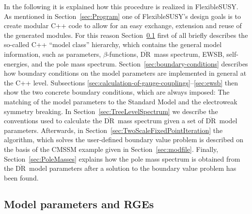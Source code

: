 \documentclass[final,3p,11pt,pdflatex]{elsarticle}
\makeatletter
\newcommand{\fs}{FlexibleSUSY\@\xspace}
\newcommand{\textoverline}[1]{$\overline{\mbox{#1}}$}
\newcommand{\DRbar}{\textoverline{DR}\xspace}
\newcommand{\secref}[1]{Section~\ref{#1}}
\makeatother
\begin{document}
In the following it is explained how this procedure is realized in
\fs.  As mentioned in \secref{sec:Program} one of \fs's design goals
is to create modular C++ code to allow for an easy exchange, extension
and reuse of the generated modules.  For this reason
\secref{sec:ModelParametersAndRGEs} first of all briefly describes the
so-called C++ ``model class'' hierarchy, which contains the general
model information, such as parameters, $\beta$-functions, \DRbar\ mass
spectrum, EWSB, self-energies, and the pole mass spectrum.
%
\secref{sec:boundary-conditions} describes how boundary conditions on
the model parameters are implemented in general at the C++ level.
Subsections \ref{sec:calculation-of-gauge-couplings}--\ref{sec:ewsb}
then show the two concrete boundary conditions, which are always
imposed: The matching of the model parameters to the Standard Model
and the electroweak symmetry breaking.
%
In \secref{sec:TreeLevelSpectrum} we describe the conventions used to
calculate the \DRbar\ mass spectrum given a set of \DRbar\ model
parameters.
%
Afterwards, in \secref{sec:TwoScaleFixedPointIteration} the algorithm,
which solves the user-defined boundary value problem is described on
the basis of the CMSSM example given in \secref{sec:modfile}.
%
Finally, \secref{sec:PoleMasses} explains how the pole mass spectrum
is obtained from the \DRbar\ model parameters after a solution to the
boundary value problem has been found.

\subsection{Model parameters and RGEs}
\label{sec:ModelParametersAndRGEs}
\end{document}
